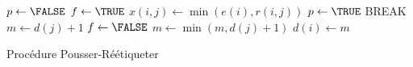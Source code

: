 \begin{algorithm}
	\begin{algorithmic}[1]
			\STATE $p \leftarrow \FALSE$ 
			\STATE $f \leftarrow \TRUE$  
					\STATE $x(i,j) \leftarrow \min(e(i), r(i,j))$  
					\STATE $p \leftarrow \TRUE$ 
					\STATE BREAK
						\STATE $m \leftarrow d(j) + 1$ 
						\STATE $f \leftarrow \FALSE $
						\STATE $m \leftarrow \min(m, d(j) + 1) $
					\ENDIF
				\ENDIF
			\ENDFOR
				\STATE $d(i) \leftarrow m$ 
			\ENDIF
		\end{algorithmic}
	\caption{Procédure Pousser-Réétiqueter}
	\label{proc_pousreet}
\end{algorithm}

